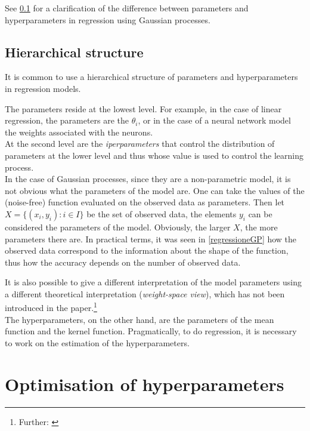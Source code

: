 See \ref{gerarchica} for a clarification of the difference between parameters and hyperparameters in regression using Gaussian processes.

\newpage

\subsection{Hierarchical structure}\label{gerarchica}
It is common to use a hierarchical structure of parameters and hyperparameters in regression models.

The parameters reside at the lowest level. For example, in the case of linear regression, the parameters are the $\theta_i$, or in the case of a neural network model the weights associated with the neurons.\\
At the second level are the \textit{iperparameters} that control the distribution of parameters at the lower level and thus whose value is used to control the learning process.\\

In the case of Gaussian processes, since they are a non-parametric model, it is not obvious what the parameters of the model are. One can take the values of the (noise-free) function evaluated on the observed data as parameters. Then let $X=\{(x_i,y_i): i\in I\}$ be the set of observed data, the elements $y_i$ can be considered the parameters of the model. Obviously, the larger $X$, the more parameters there are. In practical terms, it was seen in \ref{regressioneGP} how the observed data correspond to the information about the shape of the function, thus how the accuracy depends on the number of observed data.

It is also possible to give a different interpretation of the model parameters using a different theoretical interpretation (\textit{weight-space view}), which has not been introduced in the paper.\footnote{Further: \cite{rasmussen_gaussian_2006}}\\

The hyperparameters, on the other hand, are the parameters of the mean function and the kernel function. Pragmatically, to do regression, it is necessary to work on the estimation of the hyperparameters.


\newpage


\section{Optimisation of hyperparameters}

